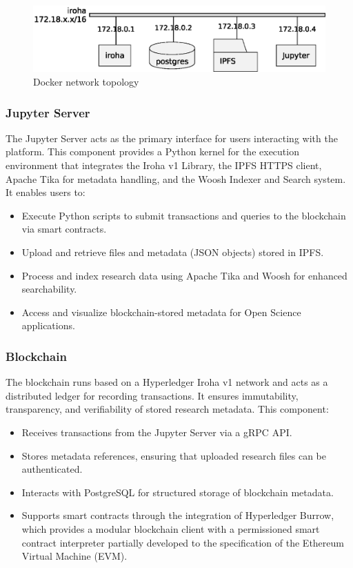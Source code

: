 \documentclass[final]{rc-book-2.14}
\begin{document}
\begin{figure}[htbp]
    \centering
    \includegraphics[scale=0.5]{fig/network_topology.eps}
    \caption{Docker network topology}
    \label{fig:docker_ntw_topology}
\end{figure}

\subsubsection{Jupyter Server}
The Jupyter Server acts as the primary interface for users interacting with the platform. This component provides a Python kernel for the execution environment that integrates the Iroha v1 Library, the IPFS HTTPS client, Apache Tika for metadata handling, and the Woosh Indexer and Search system. It enables users to:

\begin{itemize}
    \item Execute Python scripts to submit transactions and queries to the blockchain via smart contracts.
    \item Upload and retrieve files and metadata (JSON objects) stored in IPFS.
    \item Process and index research data using Apache Tika and Woosh for enhanced searchability.
    \item Access and visualize blockchain-stored metadata for Open Science applications.
\end{itemize}

\subsubsection{Blockchain}
The blockchain runs based on a Hyperledger Iroha v1 network and acts as a distributed ledger for recording transactions. It ensures immutability, transparency, and verifiability of stored research metadata. This component:
\begin{itemize}
    \item Receives transactions from the Jupyter Server via a gRPC API.
    \item Stores metadata references, ensuring that uploaded research files can be authenticated.
    \item Interacts with PostgreSQL for structured storage of blockchain metadata.
    \item Supports smart contracts through the integration of Hyperledger Burrow, which provides a modular blockchain client with a permissioned smart contract interpreter partially developed to the specification of the Ethereum Virtual Machine (EVM).

\end{itemize}
\end{document}
